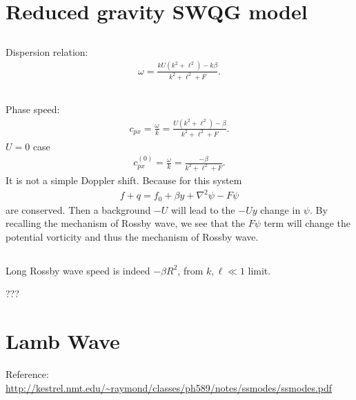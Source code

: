 \documentclass[11pt,letterpaper]{book}
\theoremstyle{definition}
\begin{document}
\section{Reduced gravity SWQG model}\label{prob:Aug_2012_2}
\subsection{}


\subsection{}
Dispersion relation:
\begin{align*}
\omega = \frac{kU(k^2+\ell^2)-k\beta}{k^2+\ell^2+F}.
\end{align*}

\subsection{}
Phase speed:
\begin{align*}
c_{px} = \frac{\omega}{k} = \frac{U(k^2+\ell^2)-\beta}{k^2+\ell^2+F}.
\end{align*}
$U = 0$ case
\begin{align*}
c_{px}^{(0)} = \frac{\omega}{k} = \frac{-\beta}{k^2+\ell^2+F}.
\end{align*}
It is not a simple Doppler shift. Because for this system
\begin{align*}
f+q = f_0+\beta y+\nabla^2\psi-F\psi
\end{align*}
are conserved. Then a background $-U$ will lead to the $-Uy$ change in $\psi$. By recalling the mechanism of Rossby wave, we see that the $F\psi$ term will change the potential vorticity and thus the mechanism of Rossby wave. 

\subsection{}
Long Rossby wave speed is indeed $-\beta R^2$, from $k,\ell\ll 1$ limit.

???

\section{Lamb Wave}
Reference: \url{http://kestrel.nmt.edu/~raymond/classes/ph589/notes/ssmodes/ssmodes.pdf}
\end{document}
